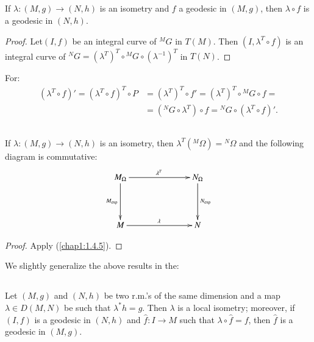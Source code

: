 \subsection{}\label{chap4:4.2.5}



\begin{coro*}
If $\lambda:(M,g)\to (N,h)$ is an isometry and $f$ a geodesic in
$(M,g)$, then $\lambda\circ f$ is a geodesic in $(N,h)$. 
\end{coro*}

\begin{proof}
Let\pageoriginale $(I,f)$ be an integral curve of ${}^{M}G$ in
$T(M)$. Then $(I,\lambda^{T}\circ f)$ is an integral curve of
${}^{N}G=(\lambda^{T})^{T}\circ {}^{M}G\circ(\lambda^{-1})^{T}$ in $T(N)$.
\end{proof}
For:
\begin{align*}
(\lambda^{T}\circ f)' =(\lambda^{T}\circ f)^{T}\circ P &=
  (\lambda^{T})^{T}\circ f'=(\lambda^{T})^{T}\circ {}^{M}G\circ f=\\
&= ({}^{N}G\circ \lambda^{T})\circ f={}^{N}G\circ (\lambda^{T}\circ f)'.
\end{align*}

\subsection{}\label{chap4:4.2.6}

\begin{coro*}
If $\lambda:(M,g)\to (N,h)$ is an isometry, then
$\lambda^{T}({}^{M}\Omega)={}^{N}\Omega$ and the following diagram is
commutative:
\[
\xymatrix@C=2.5cm@R=1.5cm{
M_{\Omega}\ar[d]_{M_{\exp}}\ar[r]^{\lambda^{T}} &
N_{\Omega}\ar[d]^{N_{\exp}}\\
M\ar[r]^{\lambda} & N
}
\]
\end{coro*}

\begin{proof}
Apply (\ref{chap1:1.4.5}).
\end{proof}

We slightly generalize the above results in the:

\subsection{}\label{chap4:4.2.7}

\begin{prop*}
Let $(M,g)$ and $(N,h)$ be two r.m.'s of the same dimension and a map
$\lambda\in D(M,N)$ be such that $\lambda^{\ast}h=g$. Then $\lambda$
is a local isometry; moreover, if $(I,f)$ is a geodesic in $(N,h)$ and
$\widehat{f}:I\to M$ such that $\lambda\circ\widehat{f}=f$, then
$\widehat{f}$ is a geodesic in $(M,g)$.
\end{prop*}

